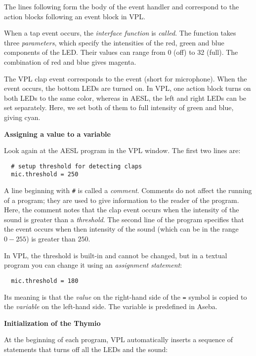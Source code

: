 The lines following  form the body of the event handler
and correspond to the action blocks following an event block in VPL.

When a tap event occurs, the \emph{interface function}  is
\emph{called}. The function takes three \emph{parameters}, which specify
the intensities of the red, green and blue components of the LED.
Their values can range from 0 (off) to 32 (full). The combination of red
and blue gives magenta.

The VPL clap event corresponds to the  event (short for
microphone). When the event occurs, the bottom LEDs are turned on. In
VPL, one action block turns on both LEDs to the same color, whereas in
AESL, the left and right LEDs can be set separately. Here, we set both
of them to full intensity of green and blue, giving cyan.

\textbf{\large Assigning a value to a variable}

Look again at the AESL program in the VPL window. The first two lines are:
\begin{footnotesize}
\begin{verbatim}
  # setup threshold for detecting claps
  mic.threshold = 250
\end{verbatim}
\end{footnotesize}

A line beginning with \verb+#+ is called a \emph{comment}. Comments do
not affect the running of a program; they are used to give information
to the reader of the program. Here, the comment notes that the clap
event occurs when the intensity of the sound is greater than a
\emph{threshold}. The second line of the program specifies that the
event occurs when then intensity of the sound (which can be in the range
$0-255$) is greater than $250$.

In VPL, the threshold is built-in and cannot be changed, but in a
textual program you can change it using an \emph{assignment statement}:
\begin{verbatim}
  mic.threshold = 180
\end{verbatim}
Its meaning is that the \emph{value} on the right-hand side of the
\verb+=+ symbol is copied to the \emph{variable} on the left-hand side.
The variable  is predefined in Aseba.

\textbf{\large Initialization of the Thymio}

At the beginning of each program, VPL automatically inserts a sequence
of statements that turns off all the LEDs and the sound:

